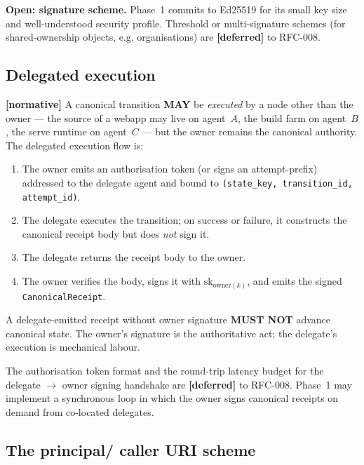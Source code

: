 \documentclass[11pt,a4paper]{article}
\newcommand{\normsv}{\textcolor{normativecolor}{\textbf{[normative]}}\xspace}
\newcommand{\deferred}{\textcolor{deferredcolor}{\textbf{[deferred]}}\xspace}
\theoremstyle{definition}
\begin{document}
\begin{decisionbox}
\textbf{Open: signature scheme.} Phase~1 commits to Ed25519 for
its small key size and well-understood security profile.
Threshold or multi-signature schemes (for shared-ownership
objects, e.g. organisations) are \deferred{} to RFC-008.
\end{decisionbox}

\subsection{Delegated execution}

\normsv{}
A canonical transition \textbf{MAY} be \emph{executed} by a node
other than the owner --- the source of a webapp may live on
agent~$A$, the build farm on agent~$B$, the serve runtime on
agent~$C$ --- but the owner remains the canonical authority. The
delegated execution flow is:

\begin{enumerate}[leftmargin=2.5em,itemsep=0.3em]
    \item The owner emits an authorisation token (or signs an
    attempt-prefix) addressed to the delegate agent and bound to
    \texttt{(state\_key, transition\_id, attempt\_id)}.
    \item The delegate executes the transition; on success or
    failure, it constructs the canonical receipt body but does
    \emph{not} sign it.
    \item The delegate returns the receipt body to the owner.
    \item The owner verifies the body, signs it with
    $\mathrm{sk}_{\mathrm{owner}(k)}$, and emits the signed
    \texttt{CanonicalReceipt}.
\end{enumerate}

A delegate-emitted receipt without owner signature \textbf{MUST
NOT} advance canonical state. The owner's signature is the
authoritative act; the delegate's execution is mechanical labour.

\begin{notebox}
The authorisation token format and the round-trip latency
budget for the delegate $\to$ owner signing handshake are
\deferred{} to RFC-008. Phase~1 may implement a synchronous
loop in which the owner signs canonical receipts on demand from
co-located delegates.
\end{notebox}

\subsection{The principal/ caller URI scheme}
\label{sec:caller-uri}
\end{document}
